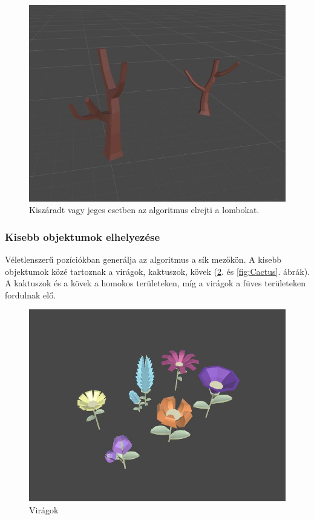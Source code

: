 
\begin{figure}[h!]
\centering
\includegraphics[scale=0.26]{kepek/Tree_Winter.JPG}
\caption[tél]{Kiszáradt vagy jeges esetben az algoritmus elrejti a lombokat. \footnotemark}
\label{fig:Tree_Winter}
\end{figure}


\newpage
\subsubsection{Kisebb objektumok elhelyezése}

Véletlenszerű pozíciókban generálja az algoritmus a sík mezőkön. A kisebb objektumok közé tartoznak a virágok, kaktuszok, kövek (\ref{fig:Flowers}. és \ref{fig:Cactus}. ábrák). A kaktuszok és a kövek a homokos területeken, míg a virágok a füves területeken fordulnak elő. 

\begin{figure}[h!]
\centering
\includegraphics[scale=0.4]{kepek/Flowers.JPG}
\caption[Virágok]{Virágok \footnotemark}
\label{fig:Flowers}
\end{figure}

